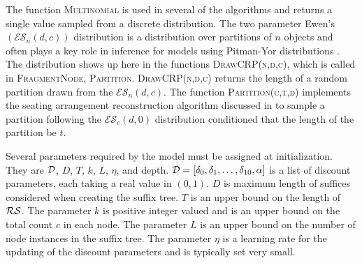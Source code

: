 The function \textsc{Multinomial} is used in several of the algorithms and returns a single value sampled from a discrete distribution.  The two parameter Ewen's $(\mathcal{E}\mathcal{S}_{n}(d,c))$ distribution is a distribution over partitions of $n$ objects and often plays a key role in inference for models using Pitman-Yor distributions \cite{Ewens_dist_ref}.  The  distribution shows up here in the functions \textsc{DrawCRP(n,d,c)}, which is called in \textsc{FragmentNode}, \textsc{Partition}.   \textsc{DrawCRP(n,d,c)} returns the length of a random partition drawn from the $\mathcal{E}\mathcal{S}_{n}(d,c)$.  The function \textsc{Partition(c,t,d)} implements the seating arrangement reconstruction algorithm discussed in \citep{Gasthaus2011} to sample a partition following the $\mathcal{E}\mathcal{S}_{c}(d,0)$ distribution conditioned that the length of the partition be $t$.

Several parameters required by the model must be assigned at initialization.  They are $\D$, $D$, $T$, $k$, $L$, $\eta$,  and depth.  $\D = [\dd_0, \dd_1, \ldots, \dd_{10}, \alpha]$ is a list of discount parameters, each taking a real value in $(0,1)$.  $D$ is maximum length of suffices considered when creating the suffix tree.  $T$ is an upper bound on the length of $\RS$.  The parameter $k$ is positive integer valued and is an upper bound on the total count $c$ in each node.  The parameter $L$ is an upper bound on the number of node instances in the suffix tree. The parameter $\eta$ is a learning rate for the updating of the discount parameters and is typically set very small.  


